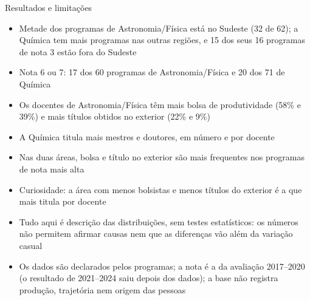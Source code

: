 \documentclass[aspectratio=169,10pt]{beamer}
\begin{document}
\begin{frame}{Resultados e limitações}
  \small
  \begin{itemize}
    \item Metade dos programas de Astronomia/Física está no Sudeste (32 de 62); a Química tem mais programas nas outras regiões, e 15 dos seus 16 programas de nota 3 estão fora do Sudeste
    \item Nota 6 ou 7: 17 dos 60 programas de Astronomia/Física e 20 dos 71 de Química
    \item Os docentes de Astronomia/Física têm mais bolsa de produtividade (58\% e 39\%) e mais títulos obtidos no exterior (22\% e 9\%)
    \item A Química titula mais mestres e doutores, em número e por docente
    \item Nas duas áreas, bolsa e título no exterior são mais frequentes nos programas de nota mais alta
    \item Curiosidade: a área com menos bolsistas e menos títulos do exterior é a que mais titula por docente
    \item Tudo aqui é descrição das distribuições, sem testes estatísticos: os números não permitem afirmar causas nem que as diferenças vão além da variação casual
    \item Os dados são declarados pelos programas; a nota é a da avaliação 2017--2020 (o resultado de 2021--2024 saiu depois dos dados); a base não registra produção, trajetória nem origem das pessoas
  \end{itemize}
\end{frame}
\end{document}
